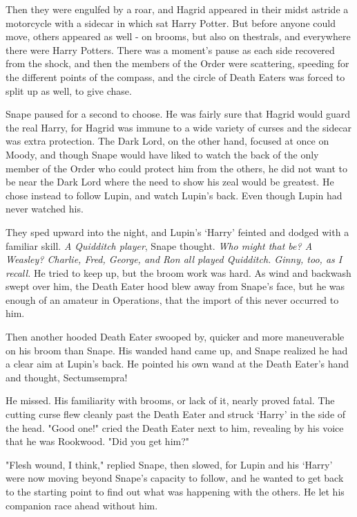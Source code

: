 Then they were engulfed by a roar, and Hagrid appeared in their midst astride a motorcycle with a sidecar in which sat Harry Potter. But before anyone could move, others appeared as well - on brooms, but also on thestrals, and everywhere there were Harry Potters. There was a moment's pause as each side recovered from the shock, and then the members of the Order were scattering, speeding for the different points of the compass, and the circle of Death Eaters was forced to split up as well, to give chase.

Snape paused for a second to choose. He was fairly sure that Hagrid would guard the real Harry, for Hagrid was immune to a wide variety of curses and the sidecar was extra protection. The Dark Lord, on the other hand, focused at once on Moody, and though Snape would have liked to watch the back of the only member of the Order who could protect him from the others, he did not want to be near the Dark Lord where the need to show his zeal would be greatest. He chose instead to follow Lupin, and watch Lupin's back. Even though Lupin had never watched his.

They sped upward into the night, and Lupin's `Harry' feinted and dodged with a familiar skill. \emph{A Quidditch player}, Snape thought. \emph{Who might that be? A Weasley? Charlie, Fred, George, and Ron all played Quidditch. Ginny, too, as I recall.} He tried to keep up, but the broom work was hard. As wind and backwash swept over him, the Death Eater hood blew away from Snape's face, but he was enough of an amateur in Operations, that the import of this never occurred to him.

Then another hooded Death Eater swooped by, quicker and more maneuverable on his broom than Snape. His wanded hand came up, and Snape realized he had a clear aim at Lupin's back. He pointed his own wand at the Death Eater's hand and thought, Sectumsempra!

He missed. His familiarity with brooms, or lack of it, nearly proved fatal. The cutting curse flew cleanly past the Death Eater and struck `Harry' in the side of the head. "Good one!" cried the Death Eater next to him, revealing by his voice that he was Rookwood. "Did you get him?"

"Flesh wound, I think," replied Snape, then slowed, for Lupin and his `Harry' were now moving beyond Snape's capacity to follow, and he wanted to get back to the starting point to find out what was happening with the others. He let his companion race ahead without him.

